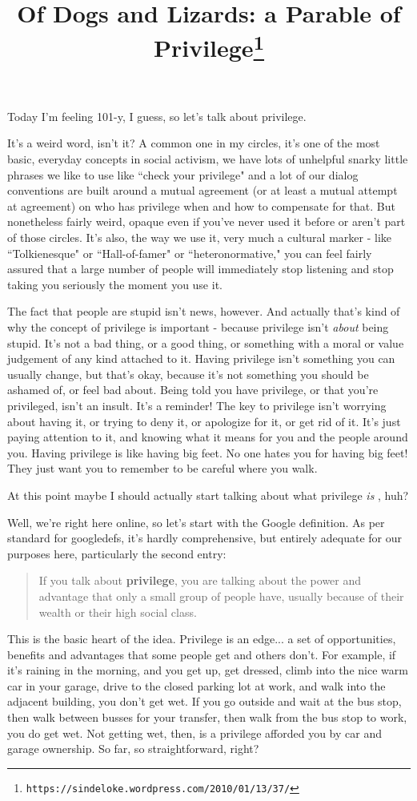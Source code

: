 \documentclass[11pt]{article}
\title{Of Dogs and Lizards: a Parable of Privilege\footnote{{\tt https://sindeloke.wordpress.com/2010/01/13/37/}}}
\begin{document}
\maketitle

Today I'm feeling 101-y, I guess, so let's talk about privilege.

It's a weird word, isn't it? A common one in my circles, it's one of the most basic, everyday concepts in social activism, we have lots of unhelpful snarky little phrases we like to use like ``check your privilege" and a lot of our dialog conventions are built around a mutual agreement (or at least a mutual attempt at agreement) on who has privilege when and how to compensate for that. But nonetheless fairly weird, opaque even if you've never used it before or aren't part of those circles. It's also, the way we use it, very much a cultural marker - like ``Tolkienesque" or ``Hall-of-famer" or ``heteronormative," you can feel fairly assured that a large number of people will immediately stop listening and stop taking you seriously the moment you use it.

The fact that people are stupid isn't news, however. And actually that's kind of why the concept of privilege is important - because privilege isn't {\it about} being stupid. It's not a bad thing, or a good thing, or something with a moral or value judgement of any kind attached to it. Having privilege isn't something you can usually change, but that's okay, because it's not something you should be ashamed of, or feel bad about. Being told you have privilege, or that you're privileged, isn't an insult. It's a reminder! The key to privilege isn't worrying about having it, or trying to deny it, or apologize for it, or get rid of it. It's just paying attention to it, and knowing what it means for you and the people around you. Having privilege is like having big feet. No one hates you for having big feet! They just want you to remember to be careful where you walk.

At this point maybe I should actually start talking about what privilege {\it is} , huh?

Well, we're right here online, so let's start with the Google definition. As per standard for googledefs, it's hardly comprehensive, but entirely adequate for our purposes here, particularly the second entry:

\begin{quote}If you talk about {\bf privilege}, you are talking about the power and advantage that only a small group of people have, usually because of their wealth or their high social class.
\end{quote}
This is the basic heart of the idea. Privilege is an edge... a set of opportunities, benefits and advantages that some people get and others don't. For example, if it's raining in the morning, and you get up, get dressed, climb into the nice warm car in your garage, drive to the closed parking lot at work, and walk into the adjacent building, you don't get wet. If you go outside and wait at the bus stop, then walk between busses for your transfer, then walk from the bus stop to work, you do get wet. Not getting wet, then, is a privilege afforded you by car and garage ownership. So far, so straightforward, right?
\end{document}
